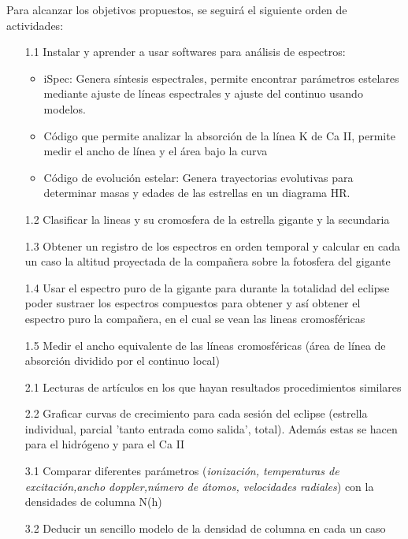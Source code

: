 \documentclass[11pt]{article}
\begin{document}
Para alcanzar los objetivos propuestos, se seguirá el siguiente orden de actividades:

\begin{itemize}

\item[1.1] Instalar y aprender a usar softwares para análisis de espectros:
\begin{itemize}
    \item iSpec: Genera síntesis espectrales, permite encontrar parámetros estelares mediante ajuste de líneas espectrales y ajuste del continuo usando modelos.
    \item Código que permite analizar la absorción de la línea K de Ca II, permite medir el ancho de línea y el área bajo la curva
    \item Código de evolución estelar: Genera trayectorias evolutivas para determinar masas y edades de las estrellas en un diagrama HR.
\end{itemize}
\item[1.2] Clasificar la lineas y su cromosfera de la estrella gigante y la secundaria
\item[1.3] Obtener un registro de los espectros en orden temporal y calcular en cada un caso la altitud proyectada de la compañera sobre la fotosfera del gigante

\item[1.4]  Usar el espectro puro de la gigante para durante la totalidad del eclipse poder sustraer los espectros compuestos para obtener y así obtener el espectro puro la compañera, en el cual se vean las lineas cromosféricas

\item[1.5] Medir el ancho equivalente de las líneas cromosféricas (área de línea de absorción dividido por el continuo local)

\item[2.1] Lecturas de artículos en los que hayan resultados procedimientos similares

\item[2.2] Graficar curvas de crecimiento para cada sesión del eclipse (estrella individual, parcial 'tanto entrada como salida', total). Además estas se hacen para el hidrógeno y para el Ca II 
\item[3.1] Comparar diferentes parámetros (\textit{ionización, temperaturas de excitación,ancho doppler,número de átomos, velocidades radiales}) con la densidades de columna N(h)

\item[3.2] Deducir un sencillo modelo de la densidad de columna en cada un caso

 
\end{itemize}
\end{document}
